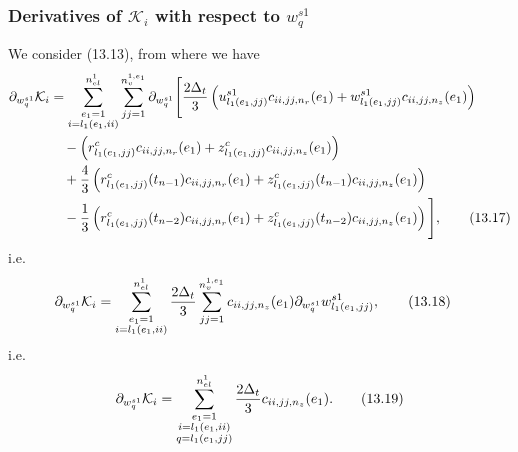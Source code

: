 \documentclass{article}
\begin{document}
\subsubsection{Derivatives of $\mathcal{K}_i$ with respect to $w_q^{s1}$} %
We consider (13.13), from where we have
\begin{align}
\partial_{w_q^{s1}} \mathcal{K}_i &= \sum_{\substack{e_1=1\\ i=l_1(e_1,ii)}}^{n_{el}^1} \sum_{jj=1}^{n_v^{1,e_1}} \partial_{w_q^{s1}} \Bigg[ \frac{2\Delta_t}{3} \left( u_{l_1(e_1,jj)}^{s1} c_{ii,jj,n_r}(e_1) + w_{l_1(e_1,jj)}^{s1} c_{ii,jj,n_z}(e_1) \right) \nonumber\\
&\quad - \left( r_{l_1(e_1,jj)}^c c_{ii,jj,n_r}(e_1) + z_{l_1(e_1,jj)}^c c_{ii,jj,n_z}(e_1) \right) \nonumber\\
&\quad + \frac{4}{3} \left( r_{l_1(e_1,jj)}^c(t_{n-1}) c_{ii,jj,n_r}(e_1) + z_{l_1(e_1,jj)}^c(t_{n-1}) c_{ii,jj,n_z}(e_1) \right) \nonumber\\
&\quad - \frac{1}{3} \left( r_{l_1(e_1,jj)}^c(t_{n-2}) c_{ii,jj,n_r}(e_1) + z_{l_1(e_1,jj)}^c(t_{n-2}) c_{ii,jj,n_z}(e_1) \right) \Bigg], \tag{13.17}
\end{align}
i.e.
\begin{align}
\partial_{w_q^{s1}} \mathcal{K}_i &= \sum_{\substack{e_1=1\\ i=l_1(e_1,ii)}}^{n_{el}^1} \frac{2\Delta_t}{3} \sum_{jj=1}^{n_v^{1,e_1}} c_{ii,jj,n_z}(e_1) \partial_{w_q^{s1}} w_{l_1(e_1,jj)}^{s1}, \tag{13.18}
\end{align}
i.e.
\begin{equation}
\partial_{w_q^{s1}} \mathcal{K}_i = \sum_{\substack{e_1=1\\ i=l_1(e_1,ii)\\ q=l_1(e_1,jj)}}^{n_{el}^1} \frac{2\Delta_t}{3} c_{ii,jj,n_z}(e_1). \tag{13.19}
\end{equation}
\end{document}
